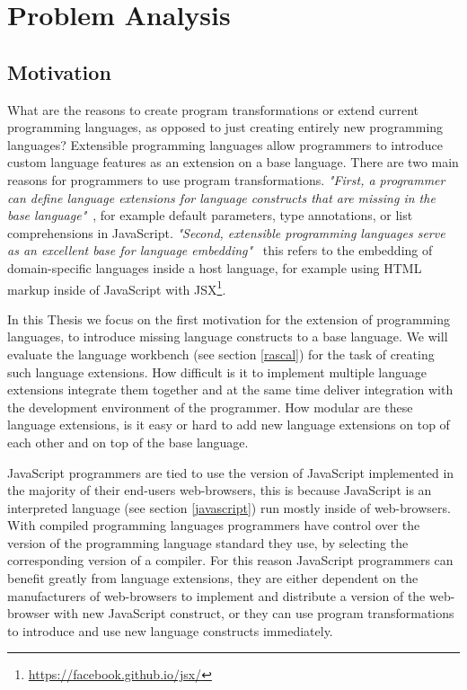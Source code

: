 
\chapter{Problem Analysis} %

\label{Chapter2}


\section{Motivation}
What are the reasons to create program transformations or extend current programming languages, as opposed to just creating entirely new programming languages? Extensible programming languages allow programmers to introduce custom language features as an extension on a base language.  There are two main reasons for programmers to use program transformations. \textit{"First, a programmer can define language extensions for language constructs that are missing in the base language"}~\cite{Erdweg2014a}, for example default parameters, type annotations, or list comprehensions in JavaScript. \textit{"Second, extensible programming languages serve as an excellent base for language embedding"}~\cite{Erdweg2014a} this refers to the embedding of domain-specific languages inside a host language, for example using HTML markup inside of JavaScript with JSX\footnote{\url{https://facebook.github.io/jsx/}}.

In this Thesis we focus on the first motivation for the extension of programming languages, to introduce missing language constructs to a base language. We will evaluate the language workbench (see section \ref{rascal}) for the task of creating such language extensions. How difficult is it to implement multiple language extensions integrate them together and at the same time deliver integration with the development environment of the programmer. How modular are these language extensions, is it easy or hard to add new language extensions on top of each other and on top of the base language.

JavaScript programmers are tied to use the version of JavaScript implemented in the majority of their end-users web-browsers, this is because JavaScript is an interpreted language (see section \ref{javascript}) run mostly inside of web-browsers. With compiled programming languages programmers have control over the version of the programming language standard they use, by selecting the corresponding version of a compiler. For this reason JavaScript programmers can benefit greatly from language extensions, they are either dependent on the manufacturers of web-browsers to implement and distribute a version of the web-browser with new JavaScript construct, or they can use program transformations to introduce and use new language constructs immediately.

